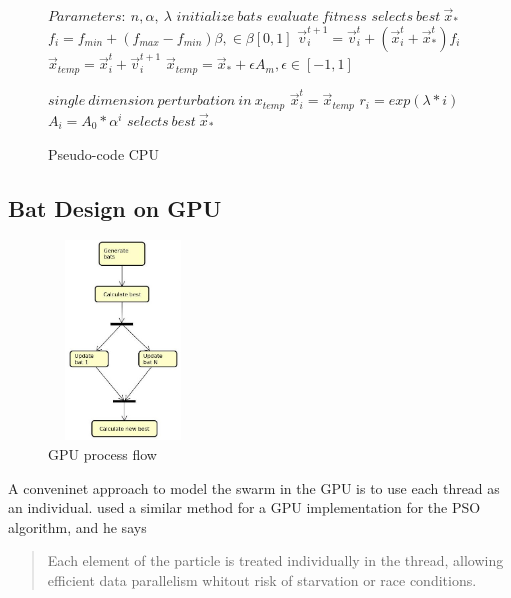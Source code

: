 \documentclass[conference]{IEEEtran}
\begin{document}
\begin{figure}
\begin{algorithmic}[1]
\State $Parameters:\ n,\alpha,\ \lambda$
\State $initialize\ bats$
\State $evaluate\ fitness$
\State $selects\ best\ \vec{x}_*$
        \State $f_i=f_{min} + (f_{max} - f_{min})\beta, \in \beta [0,1]$
        \State $\vec{v}_i^{t+1} = \vec{v}_i^{t} + (\vec{x}_i^{t} + \vec{x}_*^{t})f_i$
        \State $\vec{x}_{temp} = \vec{x}_i^{t} + \vec{v}_i^{t+1}$
            \State $\vec{x}_{temp} = \vec{x}_* + \epsilon A_m, \epsilon \in [-1, 1]$
        \EndIf

        \State $single\ dimension\ perturbation\ in\ x_{temp}$
            \State $\vec{x}_i^t = \vec{x}_{temp}$
            \State $r_i = exp(\lambda * i)$
            \State $A_i =  A_{0} * \alpha^i$
        \EndIf
    \EndFor
    \State $selects\ best\ \vec{x}_*$
\EndWhile
\end{algorithmic}
\caption{Pseudo-code CPU}\label{cpu-pseudo}
\end{figure}

\subsection{Bat Design on GPU}

\begin{figure}
    \begin{center}
    \includegraphics[width=150px,height=200px]{activity}
    \end{center}
    \caption{GPU process flow}
\end{figure}


A conveninet approach to model the swarm in the GPU is to use each
thread as an individual. \cite{pso-gpu} used a similar method for a
GPU implementation for the PSO algorithm, and he says \begin{quote}
Each element of the particle is treated individually in the thread,
allowing efficient data parallelism whitout risk of starvation or race
conditions.\end{quote}
\end{document}
